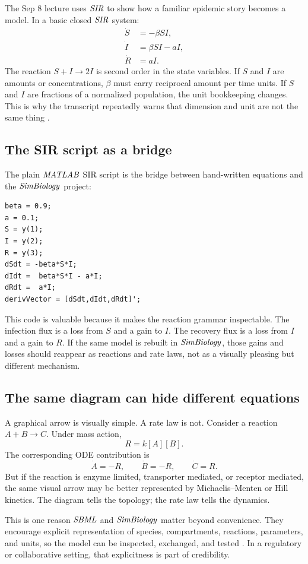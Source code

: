 \documentclass[a4paper]{article}
\newcommand{\SBML}{\ensuremath{\pksym{SBML}}}
\newcommand{\MATLAB}{\ensuremath{\pksym{MATLAB}}}
\newcommand{\SimBio}{\ensuremath{\pksym{SimBiology}}}
\newcommand{\SIR}{\ensuremath{\pksym{SIR}}}
\begin{document}
The Sep 8 lecture uses \SIR{} to show how a familiar epidemic story becomes a model. In a basic closed \SIR{} system:
\[
  \begin{aligned}
  \dot S &= -\beta SI,\\
  \dot I &= \beta SI-aI,\\
  \dot R &= aI.
  \end{aligned}
\]
The reaction \(S+I\to 2I\) is second order in the state variables. If \(S\) and \(I\) are amounts or concentrations, \(\beta\) must carry reciprocal amount per time units. If \(S\) and \(I\) are fractions of a normalized population, the unit bookkeeping changes. This is why the transcript repeatedly warns that dimension and unit are not the same thing \cite{bmeg671TranscriptsSep08to262025}.

\subsection{The SIR script as a bridge}

The plain \MATLAB{} SIR script is the bridge between hand-written equations and the \SimBio{} project:
\begin{verbatim}
beta = 0.9;
a = 0.1;
S = y(1);
I = y(2);
R = y(3);
dSdt = -beta*S*I;
dIdt =  beta*S*I - a*I;
dRdt =  a*I;
derivVector = [dSdt,dIdt,dRdt]';
\end{verbatim}
This code is valuable because it makes the reaction grammar inspectable. The infection flux is a loss from \(S\) and a gain to \(I\). The recovery flux is a loss from \(I\) and a gain to \(R\). If the same model is rebuilt in \SimBio{}, those gains and losses should reappear as reactions and rate laws, not as a visually pleasing but different mechanism.

\subsection{The same diagram can hide different equations}

A graphical arrow is visually simple. A rate law is not. Consider a reaction \(A+B\to C\). Under mass action,
\[
  R=k[A][B].
\]
The corresponding ODE contribution is
\[
  \dot A=-R,\qquad \dot B=-R,\qquad \dot C=R.
\]
But if the reaction is enzyme limited, transporter mediated, or receptor mediated, the same visual arrow may be better represented by Michaelis--Menten or Hill kinetics. The diagram tells the topology; the rate law tells the dynamics.

This is one reason \SBML{} and \SimBio{} matter beyond convenience. They encourage explicit representation of species, compartments, reactions, parameters, and units, so the model can be inspected, exchanged, and tested \cite{sbmlLevel3Version2Release2,mathworksSimBiologyTutorials2026}. In a regulatory or collaborative setting, that explicitness is part of credibility.
\end{document}

